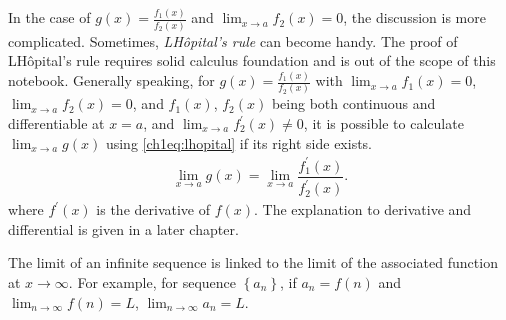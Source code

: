 In the case of $g(x)=\frac{f_1(x)}{f_2(x)}$ and $\lim_{x \rightarrow a}f_2(x) = 0$, the discussion is more complicated. Sometimes, \textit{L\textprime H\^opital's rule} can become handy. The proof of L\textprime H\^opital's rule requires solid calculus foundation and is out of the scope of this notebook. Generally speaking, for $g(x)=\frac{f_1(x)}{f_2(x)}$ with $\lim_{x\rightarrow a}f_1(x) = 0$, $\lim_{x\rightarrow a}f_2(x) = 0$, and $f_1(x)$, $f_2(x)$ being both continuous and differentiable at $x=a$, and $\lim_{x\rightarrow a}f_2^\prime(x) \neq 0$, it is possible to calculate $\lim_{x\rightarrow a}g(x)$ using \eqref{ch1eq:lhopital} if its right side exists.
\begin{eqnarray}
  \lim_{x\rightarrow a}g(x) = \lim_{x\rightarrow a} \dfrac{f_1^\prime(x)}{f_2^\prime(x)}. \label{ch1eq:lhopital}
\end{eqnarray}
where $f^\prime(x)$ is the derivative of $f(x)$. The explanation to derivative and differential is given in a later chapter.

The limit of an infinite sequence is linked to the limit of the associated function at $x\rightarrow\infty$. For example, for sequence $\left\{a_n\right\}$, if $a_n=f(n)$ and $\lim_{n\rightarrow\infty}f(n)=L$, $\lim_{n\rightarrow\infty}a_n=L$.
